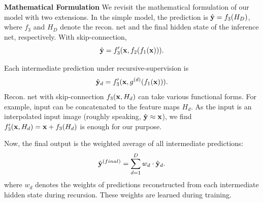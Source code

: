 \documentclass[10pt,twocolumn,letterpaper]{article}
\begin{document}
\textbf{Mathematical Formulation} We revisit the mathematical formulation of our model with two extensions. In the simple model, the prediction is $\hat{{\bf y}} = f_3(H_D)$, where $f_3$ and $H_D$ denote the recon. net and the final hidden state of the inference net, respectively. With skip-connection,  
\begin{equation}
\hat{{\bf y}} = f_3'({\bf x}, f_2(f_1({\bf x}))).
\end{equation}


Each intermediate prediction under recursive-supervision is 
\begin{equation}
\hat{{\bf y}}_{d} = f_3'({\bf x}, g^{(d)}(f_1({\bf x}))).
\end{equation}
Recon. net with skip-connection $f_3({\bf x}, H_d)$ can take various functional forms. For example, input can be concatenated to the feature maps $H_d$. As the input is an interpolated input image (roughly speaking, $\hat{\bf y} \approx {\bf x}$), we find $f_3'({\bf x}, H_d) = {\bf x} + f_3(H_d)$ is enough for our purpose. 


Now, the final output is the weighted average of all intermediate predictions:
\begin{equation}
\hat{{\bf y}}^{(final)} = \sum_{d=1}^{D} w_d \cdot \hat{{\bf y}}_d.
\end{equation}
where $w_d$ denotes the weights of predictions reconstructed from each intermediate hidden state during recursion. These weights are learned during training.
%
\end{document}
